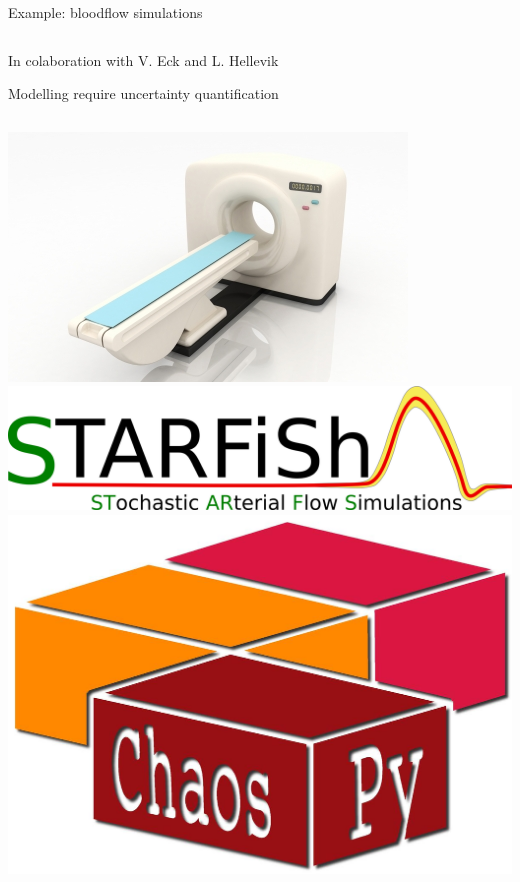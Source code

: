 \documentclass{beamer}
\begin{document}
\begin{frame}[fragile]{Example: bloodflow simulations}{}
\begin{columns}
\begin{center}
        \end{center}
    \end{columns}
    \small
    \begin{flushright}
        In colaboration with V. Eck and L. Hellevik
    \end{flushright}
\end{frame}

\begin{frame}{Modelling require uncertainty quantification}{}
    \begin{columns}
        \includegraphics[width=\textwidth]{ntnu/ID-10015904.jpg}
        \includegraphics[width=\textwidth]{ntnu/STARFiSh-Logo_small_transparent.png}
        \includegraphics[width=\textwidth]{chaospy_logo.jpg}

\end{columns}
\end{frame}
\end{document}
